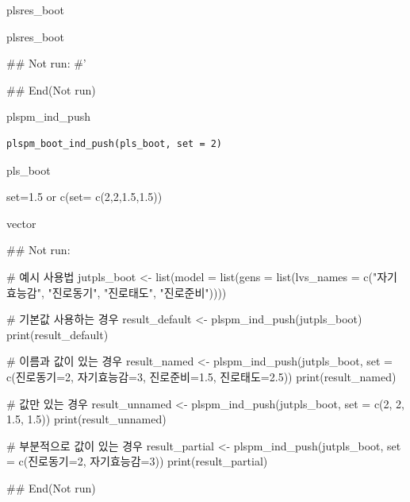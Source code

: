 \documentclass[a4paper]{book}
\begin{document}
%
\begin{Arguments}
\begin{ldescription}
\item[\code{plsres\_boot}] plsres\_boot
\end{ldescription}
\end{Arguments}
%
\begin{Value}
plsres\_boot
\end{Value}
%
\begin{Examples}
\begin{ExampleCode}
## Not run: 
#'

## End(Not run)

\end{ExampleCode}
\end{Examples}
%
\begin{Description}
plspm\_ind\_push
\end{Description}
%
\begin{Usage}
\begin{verbatim}
plspm_boot_ind_push(pls_boot, set = 2)
\end{verbatim}
\end{Usage}
%
\begin{Arguments}
\begin{ldescription}
\item[\code{pls\_boot}] pls\_boot

\item[\code{set}] set=1.5 or c(set= c(2,2,1.5,1.5))
\end{ldescription}
\end{Arguments}
%
\begin{Value}
vector
\end{Value}
%
\begin{Examples}
\begin{ExampleCode}

## Not run: 

# 예시 사용법
jutpls_boot <- list(model = list(gens = list(lvs_names = c("자기효능감", "진로동기", "진로태도", "진로준비"))))

# 기본값 사용하는 경우
result_default <- plspm_ind_push(jutpls_boot)
print(result_default)

# 이름과 값이 있는 경우
result_named <- plspm_ind_push(jutpls_boot, set = c(진로동기=2, 자기효능감=3, 진로준비=1.5, 진로태도=2.5))
print(result_named)

# 값만 있는 경우
result_unnamed <- plspm_ind_push(jutpls_boot, set = c(2, 2, 1.5, 1.5))
print(result_unnamed)

# 부분적으로 값이 있는 경우
result_partial <- plspm_ind_push(jutpls_boot, set = c(진로동기=2, 자기효능감=3))
print(result_partial)


## End(Not run)



\end{ExampleCode}
\end{Examples}
\end{document}
